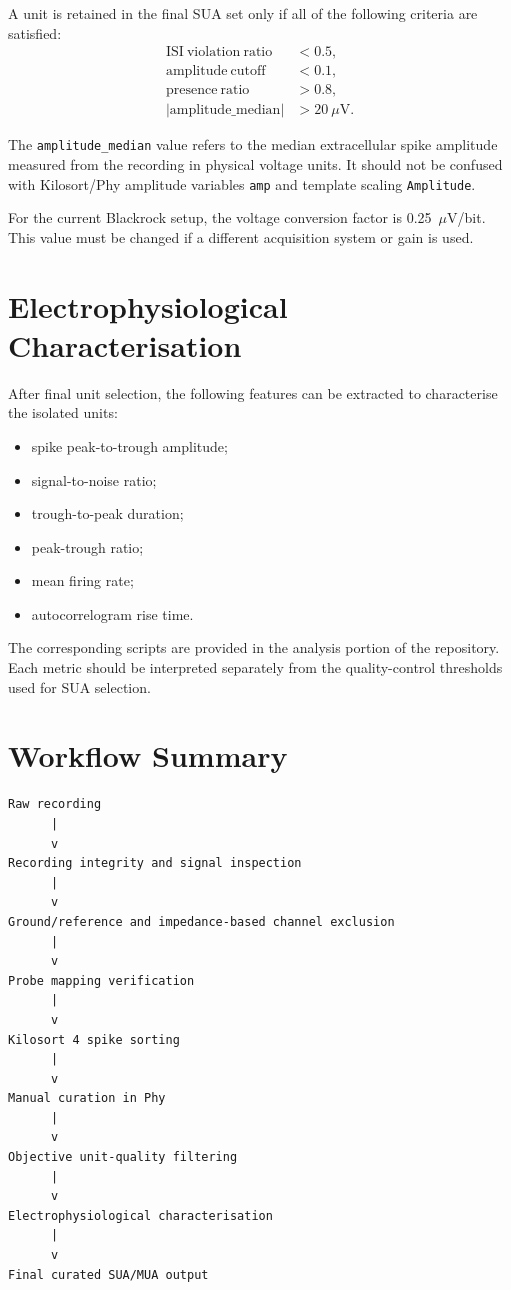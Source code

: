 \documentclass[11pt,a4paper]{article}
\begin{document}
A unit is retained in the final SUA set only if all of the following criteria are satisfied:
\begin{align}
\mathrm{ISI\ violation\ ratio} &< 0.5,\\
\mathrm{amplitude\ cutoff} &< 0.1,\\
\mathrm{presence\ ratio} &> 0.8,\\
|\mathrm{amplitude\_median}| &> 20~\mu\mathrm{V}.
\end{align}

The \texttt{amplitude\_median} value refers to the median extracellular spike amplitude measured from the recording in physical voltage units. It should not be confused with Kilosort/Phy amplitude variables \texttt{amp} and template scaling \texttt{Amplitude}.

For the current Blackrock setup, the voltage conversion factor is
0.25~$\mu$V/bit. This value must be changed if a different acquisition system or gain is used.

\section{Electrophysiological Characterisation}

After final unit selection, the following features can be extracted to
characterise the isolated units:

\begin{itemize}
    \item spike peak-to-trough amplitude;
    \item signal-to-noise ratio;
    \item trough-to-peak duration;
    \item peak-trough ratio;
    \item mean firing rate;
    \item autocorrelogram rise time.
\end{itemize}

The corresponding scripts are provided in the analysis portion of the repository. Each metric should be interpreted separately from the
quality-control thresholds used for SUA selection.

\section{Workflow Summary}

\begin{verbatim}
Raw recording
      |
      v
Recording integrity and signal inspection
      |
      v
Ground/reference and impedance-based channel exclusion
      |
      v
Probe mapping verification
      |
      v
Kilosort 4 spike sorting
      |
      v
Manual curation in Phy
      |
      v
Objective unit-quality filtering
      |
      v
Electrophysiological characterisation
      |
      v
Final curated SUA/MUA output
\end{verbatim}
\end{document}
